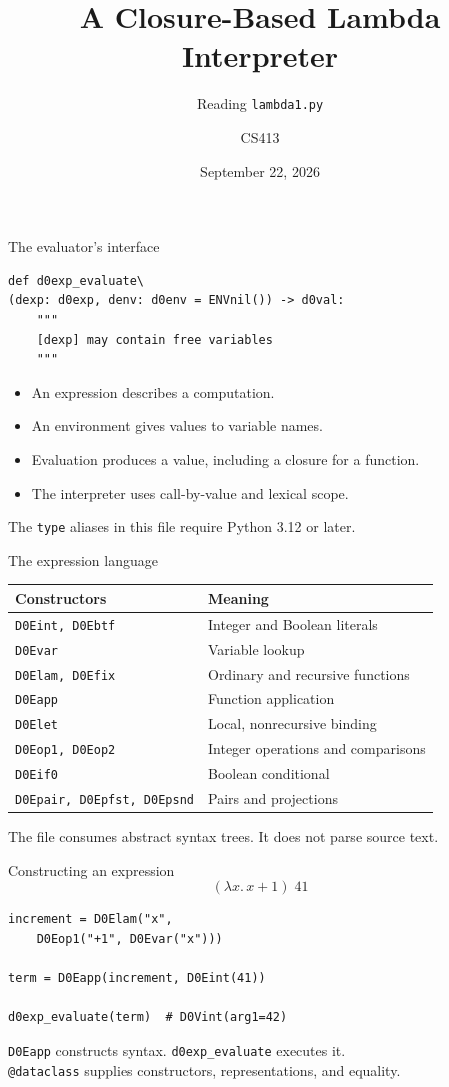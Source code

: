\documentclass[aspectratio=169,11pt]{beamer}
\title{A Closure-Based Lambda Interpreter}
\subtitle{Reading \texttt{lambda1.py}}
\author{CS413}
\date{September 22, 2026}
\begin{document}
\begin{frame}\titlepage\end{frame}

\begin{frame}[fragile]{The evaluator's interface}
\begin{lstlisting}
def d0exp_evaluate\
(dexp: d0exp, denv: d0env = ENVnil()) -> d0val:
    """
    [dexp] may contain free variables
    """
\end{lstlisting}
\bigskip
\begin{itemize}
\item An expression describes a computation.
\item An environment gives values to variable names.
\item Evaluation produces a value, including a closure for a function.
\item The interpreter uses call-by-value and lexical scope.
\end{itemize}
\medskip
The \texttt{type} aliases in this file require Python 3.12 or later.
\end{frame}

\begin{frame}{The expression language}
\begin{center}
\begin{tabular}{ll}\toprule
Constructors & Meaning\\\midrule
\texttt{D0Eint, D0Ebtf} & Integer and Boolean literals\\
\texttt{D0Evar} & Variable lookup\\
\texttt{D0Elam, D0Efix} & Ordinary and recursive functions\\
\texttt{D0Eapp} & Function application\\
\texttt{D0Elet} & Local, nonrecursive binding\\
\texttt{D0Eop1, D0Eop2} & Integer operations and comparisons\\
\texttt{D0Eif0} & Boolean conditional\\
\texttt{D0Epair, D0Epfst, D0Epsnd} & Pairs and projections\\\bottomrule
\end{tabular}
\end{center}
\medskip
The file consumes abstract syntax trees. It does not parse source text.
\end{frame}

\begin{frame}[fragile]{Constructing an expression}
\[
(\lambda x.\,x+1)\;41
\]
\begin{lstlisting}
increment = D0Elam("x",
    D0Eop1("+1", D0Evar("x")))

term = D0Eapp(increment, D0Eint(41))

d0exp_evaluate(term)  # D0Vint(arg1=42)
\end{lstlisting}
\bigskip
\texttt{D0Eapp} constructs syntax. \texttt{d0exp\_evaluate} executes it.\\[0.6em]
\texttt{@dataclass} supplies constructors, representations, and equality.
\end{frame}
\end{document}
